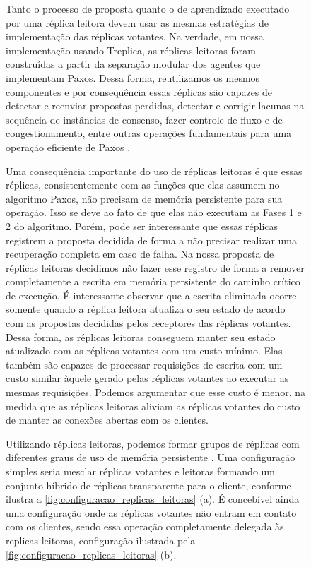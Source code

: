 \begin{figure}[ht]
Tanto o processo de proposta quanto o de aprendizado executado por uma réplica leitora
devem usar as mesmas estratégias de implementação das réplicas votantes. Na verdade, em
nossa implementação usando Treplica, as réplicas leitoras foram construídas a partir da
separação modular dos agentes que implementam Paxos. Dessa forma, reutilizamos os mesmos
componentes e por consequência essas réplicas são capazes de detectar e reenviar propostas
perdidas, detectar e corrigir lacunas na sequência de instâncias de consenso, fazer
controle de fluxo e de congestionamento, entre outras operações fundamentais para uma
operação eficiente de Paxos \cite{vieira-tr10b}.

Uma consequência importante do uso de réplicas leitoras é que essas réplicas,
consistentemente com as funções que elas assumem no algoritmo Paxos, não precisam de
memória persistente para sua operação. Isso se deve ao fato de que elas não executam as
Fases 1 e 2 do algoritmo. Porém, pode ser interessante que essas réplicas registrem a
proposta decidida de forma a não precisar realizar uma recuperação completa em caso de
falha. Na nossa proposta de réplicas leitoras decidimos não fazer esse registro de forma a
remover completamente a escrita em memória persistente do caminho crítico de execução. É
interessante observar que a escrita eliminada ocorre somente quando a réplica leitora
atualiza o seu estado de acordo com as propostas decididas pelos receptores das réplicas
votantes. Dessa forma, as réplicas leitoras conseguem manter seu estado atualizado com as
réplicas votantes com um custo mínimo. Elas também são capazes de processar requisições de
escrita com um custo similar àquele gerado pelas réplicas votantes ao executar as mesmas
requisições. Podemos argumentar que esse custo é menor, na medida que as réplicas leitoras
aliviam as réplicas votantes do custo de manter as conexões abertas com os clientes.

Utilizando réplicas leitoras, podemos formar grupos de réplicas com diferentes graus de
uso de memória persistente \cite{aguilera00}. Uma configuração simples seria mesclar
réplicas votantes e leitoras formando um conjunto híbrido de réplicas transparente para o
cliente, conforme ilustra a \autoref{fig:configuracao_replicas_leitoras} (a). É concebível
ainda uma configuração onde as réplicas votantes não entram em contato com os clientes,
sendo essa operação completamente delegada às replicas leitoras, configuração ilustrada
pela \autoref{fig:configuracao_replicas_leitoras} (b).


\end{figure}
